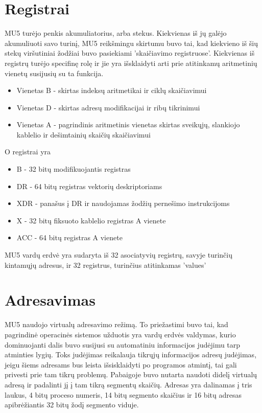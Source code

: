 \documentclass[a4paper,lithuanian]{article}
\begin{document}
\section {Registrai}

MU5 turėjo penkis akumuliatorius, arba stekus. Kiekvienas iš jų galėjo akumuliuoti savo turinį, MU5 reikšmingu skirtumu buvo tai, kad kiekvieno iš šių stekų viršutiniai žodžiai buvo pasiekiami 'skaičiavimo registruose'. Kiekvienas iš registrų turėjo specifinę rolę ir jie yra išsklaidyti arti prie atitinkamų aritmetinių vienetų susijusių su ta funkcija. 
\begin{itemize}
\item Vienetas B - skirtas indeksų aritmetikai ir ciklų skaičiavimui
\item Vienetas D - skirtas adresų modifikacijai ir ribų tikrinimui
\item Vienetas A - pagrindinis aritmetinis vienetas skirtas sveikųjų, slankiojo kablelio ir dešimtainių skaičių skaičiavimui
\end{itemize}
O registrai yra 
\begin{itemize}
\item B   - 32 bitų modifikuojantis registras
\item DR  - 64 bitų registras vektorių deskriptoriams
\item XDR - panašus į DR ir naudojamas žodžių pernešimo instrukcijoms
\item X   - 32 bitų fiksuoto kablelio registras A vienete
\item ACC - 64 bitų registras A vienete   
\end{itemize}
MU5 vardų erdvė yra sudaryta iš 32 asociatyvių registrų, savyje turinčių kintamųjų adresus, ir 32 registrus, turinčius atitinkamas 'values'

\section {Adresavimas}

MU5 naudojo virtualų adresavimo režimą. To priežastimi buvo tai, kad pagrindinė operacinės sistemos užduotis yra vardų erdvės valdymas, kurio dominuojanti dalis buvo susijusi su automatiniu informacijos judėjimu tarp atminties lygių. Toks judėjimas reikalauja tikrųjų informacijos adresų judėjimas, jeigu šiems adresams bus leista išsisklaidyti po programos atmintį, tai gali privesti prie tam tikrų problemų. Pabaigoje buvo nutarta naudoti didelį virtualų adresą ir padalinti jį į tam tikrą segmentų skaičių. Adresas yra dalinamas į tris laukus, 4 bitų proceso numeris, 14 bitų segmento skaičius ir 16 bitų adresas apibrėžiantis 32 bitų žodį segmento viduje.
\end{document}
